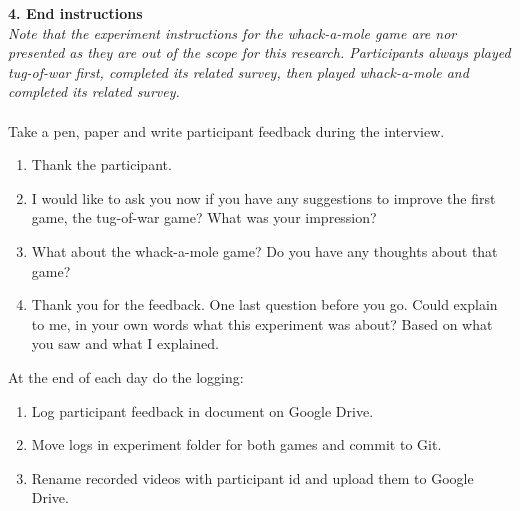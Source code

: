 \textbf{4. End instructions}\\
\textit{Note that the experiment instructions for the whack-a-mole game are nor presented as they are out of the scope for this research. Participants always played tug-of-war first, completed its related survey, then played whack-a-mole and completed its related survey.}\\
\\
Take a pen, paper and write participant feedback during the interview.
\begin{enumerate}
\itemsep0em
\item Thank the participant.
\item  I would like to ask you now if you have any suggestions to improve the first game, the tug-of-war game? What was your impression?
\item What about the whack-a-mole game? Do you have any thoughts about that game?
\item Thank you for the feedback. One last question before you go. Could explain to me, in your own words what this experiment was about? Based on what you saw and what I explained.
\end{enumerate}
At the end of each day do the logging:
\begin{enumerate}
\itemsep0em
    \item Log participant feedback in document on Google Drive.
    \item Move logs in experiment folder for both games and commit to Git.
    \item Rename recorded videos with participant id and upload them to Google Drive.
\end{enumerate}
